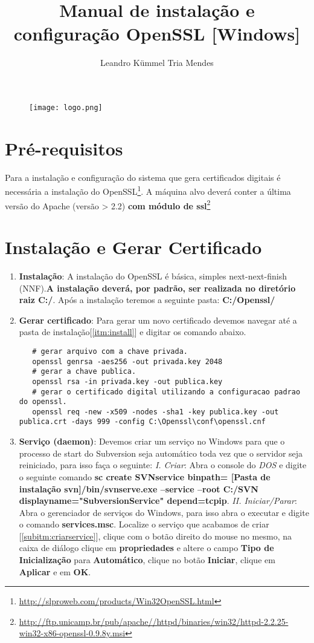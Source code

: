 \documentclass[a4paper,10pt]{article}
\title{Manual de instalação e configuração OpenSSL [Windows]}
\author{Leandro Kümmel Tria Mendes}
\begin{document}
\maketitle
\begin{figure}[!htb]
  \centering
  \texttt{[image: logo.png]}
\end{figure}
\newpage
\tableofcontents
\listoffigures
\listoftables
\section{Pré-requisitos}
Para a instalação e configuração do sistema que gera certificados digitais é necessária a instalação do OpenSSL\footnote{\url{http://slproweb.com/products/Win32OpenSSL.html}}. A máquina alvo deverá conter a última versão do Apache (versão > 2.2) \textbf{com módulo de ssl}\footnote{\url{http://ftp.unicamp.br/pub/apache//httpd/binaries/win32/httpd-2.2.25-win32-x86-openssl-0.9.8y.msi}} 
\section{Instalação e Gerar Certificado}
\begin{enumerate}[I]
\item \label{itm:install} \textbf{Instalação}: A instalação do OpenSSL é básica, simples next-next-finish (NNF).\textbf{A instalação deverá, por padrão, ser realizada no diretório raiz C:/}. Após a instalação teremos a seguinte pasta: \textbf{C:/Openssl/}
\item \label{itm:createcert} \textbf{Gerar certificado}: Para gerar um novo certificado devemos navegar até a pasta de instalação[\ref{itm:install}] e digitar os comando abaixo.
 \begin{lstlisting}
   # gerar arquivo com a chave privada.
   openssl genrsa -aes256 -out privada.key 2048 
   # gerar a chave publica.
   openssl rsa -in privada.key -out publica.key 
   # gerar o certificado digital utilizando a configuracao padrao do openssl.
   openssl req -new -x509 -nodes -sha1 -key publica.key -out publica.crt -days 999 -config C:\Openssl\conf\openssl.cnf
 \end{lstlisting}
\item \label{itm:createService} \textbf{Serviço (daemon)}: Devemos criar um serviço no Windows para que o processo de start do Subversion seja automático toda vez que o servidor seja reiniciado, para isso faça o seguinte: 
  \subitem \label{subitm:criarservice} \emph{I. Criar}: Abra o console do \emph{DOS} e digite o seguinte comando \textbf{sc create SVNservice binpath= [Pasta de instalação svn]/bin/svnserve.exe --service --root C:/SVN displayname="SubversionService" depend=tcpip}.
  \subitem \emph{II. Iniciar/Parar}: Abra o gerenciador de serviços do Windows, para isso abra o executar e digite o comando \textbf{services.msc}. Localize o serviço que acabamos de criar [\ref{subitm:criarservice}], clique com o botão direito do mouse no mesmo, na caixa de diálogo clique em \textbf{propriedades} e altere o campo \textbf{Tipo de Inicialização} para \textbf{Automático}, clique no botão \textbf{Iniciar}, clique em \textbf{Aplicar} e em \textbf{OK}.
\end{enumerate}
\end{document}
